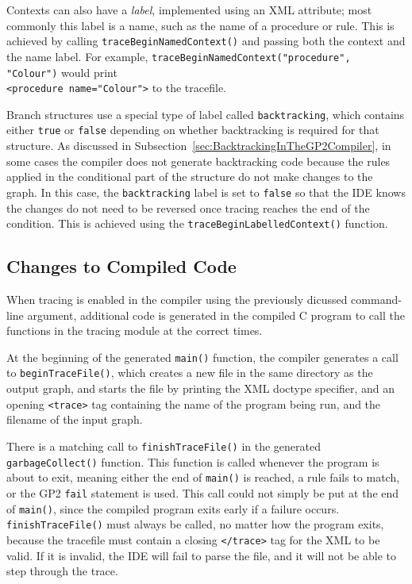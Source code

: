 \documentclass[authoryearcitations]{UoYCSproject}
\begin{document}
Contexts can also have a \emph{label}, implemented using an XML attribute; most
commonly this label is a name, such as the name of a procedure or rule. This is
achieved by calling \texttt{traceBeginNamedContext()} and passing both the
context and the name label. For example, \texttt{traceBeginNamedContext("procedure", "Colour")}
would print \\
\texttt{<procedure name="Colour">} to the tracefile.

Branch structures use a special type of label called \texttt{backtracking}, which
contains either \texttt{true} or \texttt{false} depending on whether backtracking
is required for that structure. As discussed in Subsection~\ref{sec:BacktrackingInTheGP2Compiler},
in some cases the compiler does not generate backtracking code because the
rules applied in the conditional part of the structure do not make changes to
the graph. In this case, the \texttt{backtracking} label is set to \texttt{false}
so that the IDE knows the changes do not need to be reversed once tracing reaches
the end of the condition. This is achieved using the \texttt{traceBeginLabelledContext()}
function.


\subsection{Changes to Compiled Code}
\label{sec:ChangesToCompiledCode}

When tracing is enabled in the compiler using the previously dicussed command-line
argument, additional code is generated in the compiled C program to call the
functions in the tracing module at the correct times.

At the beginning of the generated \texttt{main()} function, the compiler generates
a call to \texttt{beginTraceFile()}, which creates a new file in the same
directory as the output graph, and starts the file by printing the XML doctype
specifier, and an opening \texttt{<trace>} tag containing the name of the program
being run, and the filename of the input graph.

There is a matching call to \texttt{finishTraceFile()} in the generated \texttt{garbageCollect()}
function. This function is called whenever the program is about to exit, meaning
either the end of \texttt{main()} is reached, a rule fails to match, or the GP2
\texttt{fail} statement is used. This call could not simply be put at the end
of \texttt{main()}, since the compiled program exits early if a failure occurs.
\texttt{finishTraceFile()} must always be called, no matter how the program exits,
because the tracefile must contain a closing \texttt{</trace>} tag for the XML
to be valid. If it is invalid, the IDE will fail to parse the file, and it will
not be able to step through the trace.
\end{document}
